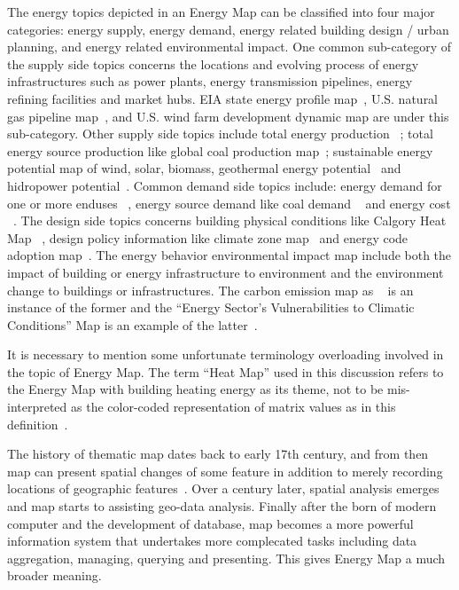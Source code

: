 \documentclass[12pt]{article}
\begin{document}
The energy topics depicted in an Energy Map can be classified into
four major categories: energy supply, energy demand, energy related
building design / urban planning, and energy related environmental
impact. One common sub-category of the supply side topics concerns the
locations and evolving process of energy infrastructures such as power
plants, energy transmission pipelines, energy refining facilities and
market hubs. EIA state energy profile map~\cite{EIAProfile2015},
U.S. natural gas pipeline map~\cite{EIAGaspipe}, and U.S. wind farm
development dynamic map \cite{DOEWindFarm} are under this
sub-category. Other supply side topics include total energy production
~\cite{DOEEnergyProduct}; total energy source production like global
coal production map~\cite{EIACoalProduct}; sustainable energy
potential map of wind, solar, biomass, geothermal energy
potential~\cite{NRELMap2015} and hidropower
potential~\cite{DOEHydro}. Common demand side topics include: energy
demand for one or more enduses ~\cite{heatMap2012}, energy source
demand like coal demand ~\cite{EIACoalDemand} and energy cost
~\cite{DOEEnergyCost}. The design side topics concerns building
physical conditions like Calgory Heat Map ~\cite{Hay2011}, design
policy information like climate zone map~\cite{IECCClimate} and energy
code adoption map~\cite{CodeAdopt}. The energy behavior environmental
impact map include both the impact of building or energy
infrastructure to environment and the environment change to buildings
or infrastructures. The carbon emission map as ~\cite{CO2Atlas} is an
instance of the former and the ``Energy Sector's Vulnerabilities to
Climatic Conditions'' Map is an example of the
latter~\cite{DOEVulner}.

It is necessary to mention some unfortunate terminology overloading
involved in the topic of Energy Map. The term ``Heat Map'' used in
this discussion refers to the Energy Map with building heating energy
as its theme, not to be mis-interpreted as the color-coded
representation of matrix values as in this
definition~\cite{HeatmapWiki}.

The history of thematic map dates back to early 17th century, and from
then map can present spatial changes of some feature in addition to
merely recording locations of geographic
features~\cite{ThematicMap}. Over a century later, spatial analysis
emerges and map starts to assisting geo-data analysis. Finally
after the born of modern computer and the development of database, map
becomes a more powerful information system that undertakes more
complecated tasks including data aggregation, managing, querying and
presenting. This gives Energy Map a much broader meaning.
\end{document}
